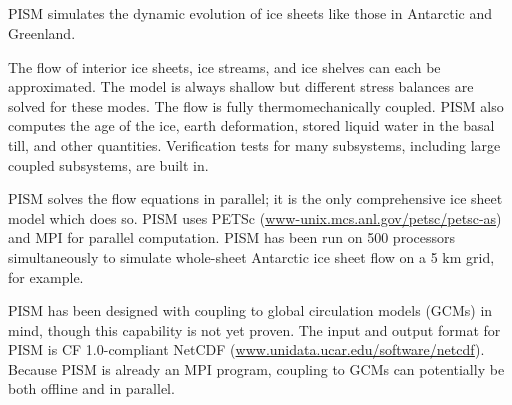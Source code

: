 \documentclass[12pt,final]{amsart}
\title[]{\protect{\large Parallel Ice Sheet Model (PISM):\normalsize} \\ \protect{\large\medskip A Summary\normalsize}}
\newcommand{\tablespacing}{\renewcommand{\baselinestretch}{1.0}\tiny\normalsize}
\begin{document}
\maketitle
\thispagestyle{empty}

PISM simulates the dynamic evolution of ice sheets like those in Antarctic and Greenland.

The flow of interior ice sheets, ice streams, and ice shelves can each be approximated.  The model is always shallow but different stress balances are solved for these modes.  The flow is fully thermomechanically coupled.  PISM also computes the age of the ice, earth deformation, stored liquid water in the basal till, and other quantities.   Verification tests for many subsystems, including large coupled subsystems, are built in.

PISM solves the flow equations in parallel; it is the only comprehensive ice sheet model which does so.  PISM uses PETSc (\href{http://www-unix.mcs.anl.gov/petsc/petsc-as/}{www-unix.mcs.anl.gov/petsc/petsc-as}) and MPI for parallel computation.  PISM has been run on 500 processors simultaneously to simulate whole-sheet Antarctic ice sheet flow on a 5 km grid, for example.

PISM has been designed with coupling to global circulation models (GCMs) in mind, though this capability is not yet proven.  The input and output format for PISM is CF 1.0-compliant NetCDF (\href{http://www.unidata.ucar.edu/software/netcdf/}{www.unidata.ucar.edu/software/netcdf}).  Because PISM is already an MPI program, coupling to GCMs can potentially be both offline and in parallel.
\end{document}
